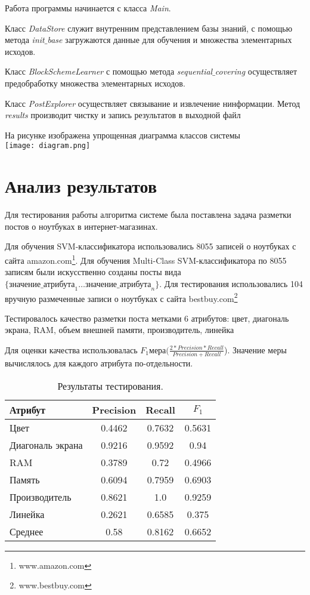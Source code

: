 Работа программы начинается с класса \textit{Main}.

Класс \textit{DataStore} служит внутренним представлением базы знаний, с помощью метода \textit{init$\_$base} загружаются данные для обучения и множества элементарных исходов.

Класс \textit{BlockSchemeLearner} с помощью метода \textit{sequential$\_$covering} осуществляет предобработку множества элементарных исходов.

Класс \textit{PostExplorer} осуществляет связывание и извлечение нинформации. Метод \textit{results} производит чистку и запись результатов в выходной файл

На рисунке изображена упрощенная диаграмма классов системы\\
\texttt{[image: diagram.png]}


\section{Анализ результатов}

Для тестирования работы алгоритма системе была поставлена задача разметки постов о ноутбуках в интернет-магазинах.

Для обучения SVM-классификатора использовались 8055 записей о ноутбуках с сайта amazon.com\footnote{www.amazon.com}. Для обучения Multi-Class SVM-классификатора по 8055 записям были искусственно созданы посты вида $\{\text{значение}\_\text{атрибута}_1 \ldots\text{значение}\_\text{атрибута}_n\}$. Для тестирования использовались 104 вручную размеченные записи о ноутбуках с сайта bestbuy.com\footnote{www.bestbuy.com}

Тестировалось качество разметки поста метками 6 атрибутов: цвет, диагональ экрана, RAM, объем внешней памяти, производитель, линейка

Для оценки качества использовалась $F_1 \text{мера} (\frac{2*Precision*Recall}{Precision + Recall}$). Значение меры вычислялось для каждого атрибута по-отдельности.\\

\begin{table}[H]
\caption{Результаты тестирования.}
\begin{center}
\begin{tabular}{|l|c|c|c|}
\hline
Атрибут & Precision & Recall & $F_1$\\
\hline
Цвет & 0.4462 & 0.7632 & 0.5631\\
Диагональ экрана & 0.9216 & 0.9592 & 0.94\\
RAM & 0.3789 & 0.72 & 0.4966\\
Память & 0.6094 & 0.7959 & 0.6903\\
Производитель & 0.8621 & 1.0 & 0.9259\\
Линейка & 0.2621 & 0.6585 & 0.375\\
\hline
Среднее & 0.58 & 0.8162 & 0.6652\\
\hline
\end{tabular}
\end{center}
\end{table}



